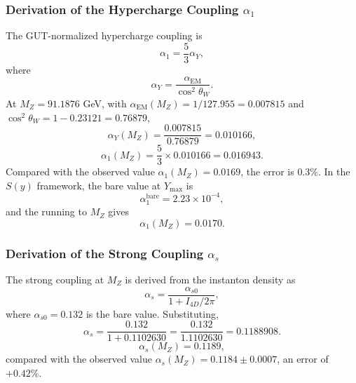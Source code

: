 \documentclass[12pt,oneside,openany]{book}
\begin{document}
\subsubsection{Derivation of the Hypercharge Coupling $\alpha_1$}

The GUT-normalized hypercharge coupling is
\begin{equation}
\alpha_1 = \frac{5}{3}\alpha_Y,
\label{eq:alpha1-def}
\end{equation}
where
\begin{equation}
\alpha_Y = \frac{\alpha_{\mathrm{EM}}}{\cos^2\theta_W}.
\label{eq:alphaY}
\end{equation}
At $M_Z = 91.1876$ GeV, with $\alpha_{\mathrm{EM}}(M_Z) = 1/127.955 = 0.007815$ and $\cos^2\theta_W = 1 - 0.23121 = 0.76879$,
\begin{equation}
\alpha_Y(M_Z) = \frac{0.007815}{0.76879} = 0.010166,
\label{eq:alphaY-num}
\end{equation}
\begin{equation}
\alpha_1(M_Z) = \frac{5}{3} \times 0.010166 = 0.016943.
\label{eq:alpha1-num}
\end{equation}
Compared with the observed value $\alpha_1(M_Z) = 0.0169$, the error is $0.3\%$. In the $S(y)$ framework, the bare value at $Y_{\max}$ is
\begin{equation}
\alpha_1^{\mathrm{bare}} = 2.23 \times 10^{-4},
\label{eq:alpha1-bare}
\end{equation}
and the running to $M_Z$ gives
\begin{equation}
\boxed{\alpha_1(M_Z) = 0.0170.}
\label{eq:alpha1-final}
\end{equation}

\subsubsection{Derivation of the Strong Coupling $\alpha_s$}

The strong coupling at $M_Z$ is derived from the instanton density as
\begin{equation}
\alpha_s = \frac{\alpha_{s0}}{1 + I_{4D}/2\pi},
\label{eq:alphas-def}
\end{equation}
where $\alpha_{s0} = 0.132$ is the bare value. Substituting,
\begin{equation}
\alpha_s = \frac{0.132}{1 + 0.1102630} = \frac{0.132}{1.1102630} = 0.1188908.
\label{eq:alphas-num}
\end{equation}
\begin{equation}
\boxed{\alpha_s(M_Z) = 0.1189,}
\label{eq:alphas-final}
\end{equation}
compared with the observed value $\alpha_s(M_Z) = 0.1184 \pm 0.0007$, an error of $+0.42\%$.
\end{document}
